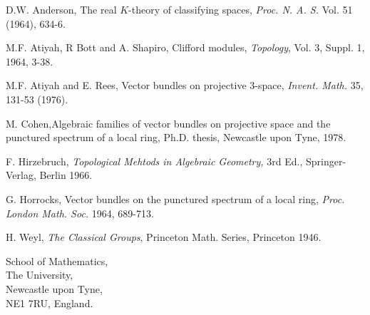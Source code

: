 \begin{thebibliography}{}
 D.W. Anderson, The real $K$-theory of classifying
spaces, {\em Proc. N. A. S.} Vol. 51 (1964), 634-6.

 M.F. Atiyah, R Bott and A. Shapiro, Clifford
modules, {\em Topology}, Vol. 3, Suppl. 1, 1964, 3-38.

 M.F. Atiyah and E. Rees, Vector bundles on
projective 3-space, {\em Invent. Math.} 35, 131-53 (1976).

 M. Cohen,\pageoriginale Algebraic families of
vector bundles on projective space and the punctured spectrum of a
local ring, Ph.D. thesis, Newcastle upon Tyne, 1978.

 F. Hirzebruch, {\em Topological Mehtods in
Algebraic Geometry,} 3rd Ed., Springer-Verlag, Berlin 1966.

 G. Horrocks, Vector bundles on the punctured
spectrum of a local ring, {\em Proc. London Math. Soc.} 1964,
689-713. 

 H. Weyl, {\em The Classical Groups}, Princeton
Math. Series, Princeton 1946.
\end{thebibliography}

\vskip 1cm

\noindent
School of Mathematics,\\
The University,\\
Newcastle upon Tyne,\\
NE1 7RU, England.

\newpage

~\phantom{A}
\thispagestyle{empty}






